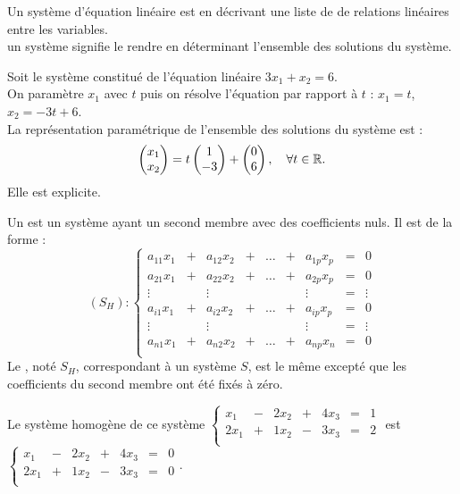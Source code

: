 \documentclass[a4paper]{book}
\begin{document}
\begin{Definition}
Un système d'équation linéaire est  en décrivant une liste de 
de relations linéaires entre les variables. \\
 un système signifie le rendre  en déterminant l'ensemble des solutions du système.
\end{Definition}
\begin{Exemple}
Soit le système constitué de l'équation linéaire $3x_1 + x_2= 6$.\\ 
On paramètre $x_1$ avec $t$ puis on résolve l'équation par
rapport à $t$ : $x_1 = t$, $x_2 = -3t+6$.\\
La représentation paramétrique de l'ensemble des solutions du système est : 
$$\begin{pmatrix}
x_1\\x_2
\end{pmatrix}= t \begin{pmatrix}
1\\
-3
\end{pmatrix}+\begin{pmatrix}
0\\
6
\end{pmatrix},\quad \forall t\in \mathbb{R}.$$
Elle est explicite.
\end{Exemple}
 \begin{Definition}
Un  est un système ayant un second membre avec des coefficients nuls. Il est de la forme :
$$(S_H):\left\{{\begin{matrix}
a_{11}x_{1}&+&a_{12}x_{2}&+&\dots &+&a_{1p}x_{p}&=&0\\
a_{21}x_{1}&+&a_{22}x_{2}&+&\dots &+&a_{2p}x_{p}&=&0\\
\vdots&&\vdots&& &&\vdots&=&\vdots \\
a_{i1}x_{1}&+&a_{i2}x_{2}&+&\dots &+&a_{ip}x_{p}&=&0\\
\vdots&&\vdots&& &&\vdots&=&\vdots \\
a_{n1}x_{1}&+&a_{n2}x_{2}&+&\dots &+&a_{np}x_{n}&=&0\\
\end{matrix}}\right. $$
Le , noté $S_H$, correspondant à un système $S$, est le même  excepté que les coefficients  du second membre ont été fixés à zéro.    
\end{Definition}
\begin{Exemple}
Le système homogène de ce système  
$\left\{{\begin{matrix}
x_{1}&-&2x_{2}&+&4x_{3}&=&1\\
2x_{1}&+&1x_{2}&-&3x_{3}&=&2\\
\end{matrix}}\right. $ est  $\left\{{\begin{matrix}
x_{1}&-&2x_{2}&+&4x_{3}&=&0\\
2x_{1}&+&1x_{2}&-&3x_{3}&=&0\\
\end{matrix}}\right. $.
\end{Exemple}
\end{document}
